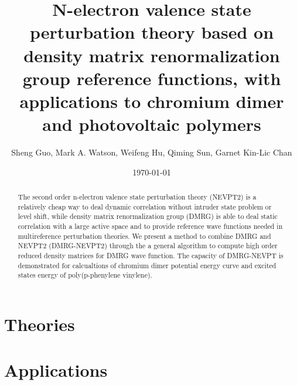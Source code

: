 \documentclass[
 aip,
 jcp,
 numerical ,
 reprint, %
]{revtex4-1}
\begin{document}
\title{N-electron valence state perturbation theory based on density matrix renormalization group reference functions, with applications to chromium dimer and photovoltaic polymers}
\author{Sheng Guo, Mark A. Watson, Weifeng Hu, Qiming Sun, Garnet Kin-Lic Chan}

\begin{abstract}

The second order n-electron valence state perturbation theory (NEVPT2) is a relatively cheap way to deal dynamic correlation without intruder state problem or level shift, while density matrix renormalization group (DMRG) is able to deal static correlation with a large active space and to provide reference wave functions needed in multireference perturbation theories.
We present a method to combine DMRG and NEVPT2 (DMRG-NEVPT2) through the a general algorithm to compute high order reduced density matrices for DMRG wave function. The capacity of DMRG-NEVPT is demonstrated for calcualtions of chromium dimer potential energy curve and excited states energy of poly(p-phenylene vinylene).

\end{abstract}

\date{\today}

\maketitle



\section{Theories}







\section{Applications}








{}
\end{document}
